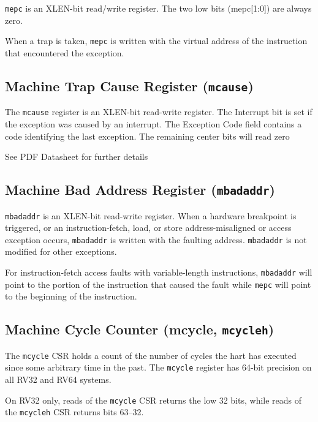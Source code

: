 \texttt{mepc} is an XLEN-bit read/write register. The two low bits
(mepc[1:0]) are always zero.



When a trap is taken, \texttt{mepc} is written with the virtual address of the
instruction that encountered the exception.

\subsection{Machine Trap Cause Register
(\texttt{mcause})}\label{machine-trap-cause-register-mcause}

The \texttt{mcause} register is an XLEN-bit read-write register. The Interrupt
bit is set if the exception was caused by an interrupt. The Exception
Code field contains a code identifying the last exception. The remaining
center bits will read zero



See PDF Datasheet for further details

\subsection{Machine Bad Address Register
(\texttt{mbadaddr})}\label{machine-bad-address-register-mbadaddr}

\texttt{mbadaddr} is an XLEN-bit read-write register. When a hardware breakpoint
is triggered, or an instruction-fetch, load, or store address-misaligned
or access exception occurs, \texttt{mbadaddr} is written with the faulting
address. \texttt{mbadaddr} is not modified for other exceptions.



For instruction-fetch access faults with variable-length instructions,
\texttt{mbadaddr} will point to the portion of the instruction that caused the
fault while \texttt{mepc} will point to the beginning of the instruction.

\subsection{Machine Cycle Counter (mcycle,
\texttt{mcycleh})}\label{machine-cycle-counter-mcycle-mcycleh}

The \texttt{mcycle} CSR holds a count of the number of cycles the hart has
executed since some arbitrary time in the past. The \texttt{mcycle} register has
64-bit precision on all RV32 and RV64 systems.

On RV32 only, reads of the \texttt{mcycle} CSR returns the low 32 bits, while
reads of the \texttt{mcycleh} CSR returns bits 63--32.

